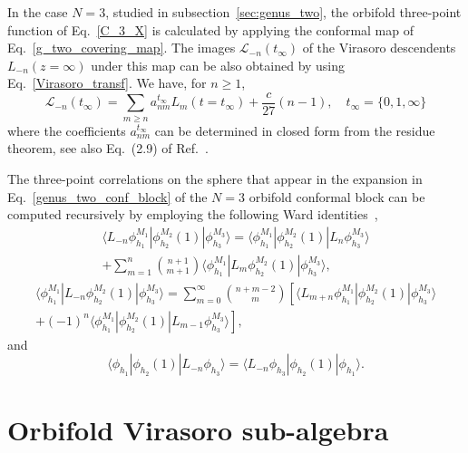 \documentclass[a4paper,11pt]{article}
\begin{document}
In the case $N=3$, studied in subsection~\ref{sec:genus_two}, the orbifold three-point function of Eq.~\eqref{C_3_X} is calculated by
applying the conformal map of Eq.~\eqref{g_two_covering_map}. The images $\mathcal{L}_{-n}(t_\infty)$ of the Virasoro descendents 
$L_{-n}(z=\infty)$ under this map can be also obtained by using Eq.~\eqref{Virasoro_transf}. We have, for $n\geq 1$,
\begin{equation}\label{vir_g2} 
 \mathcal{L}_{-n}(t_\infty)=\sum_{m\geq n}a_{nm}^{t_\infty}L_{m}(t=t_{\infty})+\frac{c}{27}(n-1),
 \quad t_\infty=\{0, 1, \infty\}
\end{equation}
where the coefficients $a_{nm}^{t_\infty}$ can be determined in closed form from the residue theorem, see also Eq.~(2.9) of Ref.~\cite{Collier}.

The three-point correlations on the sphere that appear in the expansion in Eq.~\eqref{genus_two_conf_block} of the $N=3$ orbifold 
conformal block can be computed recursively by employing the following Ward identities~\cite{Teschner},
\begin{multline}
\label{wardvir1}
 \langle L_{-n}\phi_{h_1}^{M_1}|\phi_{h_2}^{M_2}(1)|\phi_{h_3}^{M_3}\rangle=
 \langle \phi_{h_1}^{M_1}|\phi_{h_2}^{M_2}(1)|L_n \phi_{h_3}^{M_3}\rangle \\
 +\sum_{m= 1}^n \binom{n+1}{m+1}\langle \phi_{h_1}^{M_1}|L_m \phi_{h_2}^{M_2}(1)|\phi_{h_3}^{M_3}\rangle,
\end{multline}
\begin{multline}
\label{wardvir2}
 \langle \phi_{h_1}^{M_1}|L_{-n}\phi_{h_2}^{M_2}(1)|\phi_{h_3}^{M_3}\rangle=
 \sum_{m=0}^\infty\binom{n+m-2}{m}
 \left[\langle L_{m+n} \phi_{h_1}^{M_1}|\phi_{h_2}^{M_2}(1)|\phi_{h_3}^{M_3}\rangle \right.\\ +
 \left. (-1)^n\langle \phi_{h_1}^{M_1}|\phi_{h_2}^{M_2}(1)|L_{m-1} \phi_{h_3}^{M_3}\rangle\right],
\end{multline}
and
\begin{equation}
 \langle \phi_{h_1}|\phi_{h_2}(1)|L_{-n}\phi_{h_3}\rangle=
 \langle L_{-n}\phi_{h_3}|\phi_{h_2}(1)|\phi_{h_1}\rangle.
\end{equation}


\section{Orbifold Virasoro sub-algebra}\label{app_orbifold_algebra}
\end{document}
